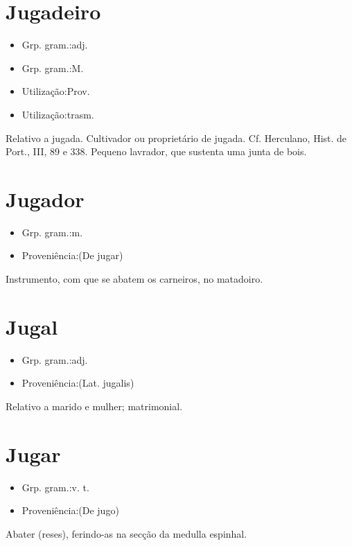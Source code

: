 \documentclass{article}
\begin{document}
\section{Jugadeiro}
\begin{itemize}
\item {Grp. gram.:adj.}
\end{itemize}
\begin{itemize}
\item {Grp. gram.:M.}
\end{itemize}
\begin{itemize}
\item {Utilização:Prov.}
\end{itemize}
\begin{itemize}
\item {Utilização:trasm.}
\end{itemize}
Relativo a jugada.
Cultivador ou proprietário de jugada. Cf. Herculano, \textunderscore Hist. de Port.\textunderscore , III, 89 e 338.
Pequeno lavrador, que sustenta uma junta de bois.
\section{Jugador}
\begin{itemize}
\item {Grp. gram.:m.}
\end{itemize}
\begin{itemize}
\item {Proveniência:(De \textunderscore jugar\textunderscore )}
\end{itemize}
Instrumento, com que se abatem os carneiros, no matadoiro.
\section{Jugal}
\begin{itemize}
\item {Grp. gram.:adj.}
\end{itemize}
\begin{itemize}
\item {Proveniência:(Lat. \textunderscore jugalis\textunderscore )}
\end{itemize}
Relativo a marido e mulher; matrimonial.
\section{Jugar}
\begin{itemize}
\item {Grp. gram.:v. t.}
\end{itemize}
\begin{itemize}
\item {Proveniência:(De \textunderscore jugo\textunderscore )}
\end{itemize}
Abater (reses), ferindo-as na secção da medulla espinhal.
\end{document}
